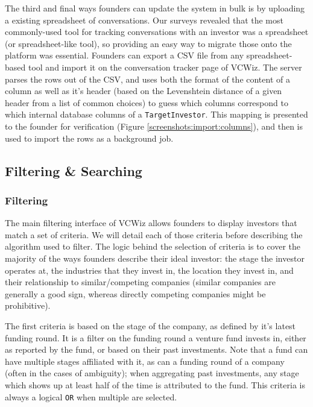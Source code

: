 The third and final ways founders can update the system in bulk is by uploading a existing spreadsheet of conversations. Our surveys revealed that the most commonly-used tool for tracking conversations with an investor was a spreadsheet (or spreadsheet-like tool), so providing an easy way to migrate those onto the platform was essential. Founders can export a CSV file from any spreadsheet-based tool and import it on the conversation tracker page of VCWiz. The server parses the rows out of the CSV, and uses both the format of the content of a column as well as it's header (based on the Levenshtein distance \cite{1966SPhD...10..707L} of a given header from a list of common choices) to guess which columns correspond to which internal database columns of a \texttt{TargetInvestor}. This mapping is presented to the founder for verification (Figure \ref{screenshots:import:columns}), and then is used to import the rows as a background job.

\subsection{Filtering \& Searching}

\subsubsection{Filtering}

The main filtering interface of VCWiz allows founders to display investors that match a set of criteria. We will detail each of those criteria before describing the algorithm used to filter. The logic behind the selection of criteria is to cover the majority of the ways founders describe their ideal investor: the stage the investor operates at, the industries that they invest in, the location they invest in, and their relationship to similar/competing companies (similar companies are generally a good sign, whereas directly competing companies might be prohibitive).

The first criteria is based on the stage of the company, as defined by it's latest funding round. It is a filter on the funding round a venture fund invests in, either as reported by the fund, or based on their past investments. Note that a fund can have multiple stages affiliated with it, as can a funding round of a company (often in the cases of ambiguity); when aggregating past investments, any stage which shows up at least half of the time is attributed to the fund. This criteria is always a logical \texttt{OR} when multiple are selected.

